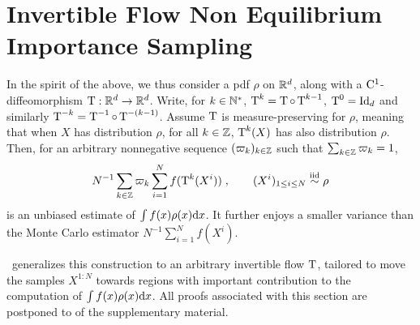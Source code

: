 \documentclass{article}
\begin{document}
\section{Invertible Flow Non Equilibrium Importance Sampling}\label{sec:IFIS}
In the spirit of the above, we thus consider a pdf $\rho$ on $\mathbb{R}^{d}$, along with a $\mathrm{C}^1$-diffeomorphism
$\operatorname{T}:\mathbb{R}^{d}\to \mathbb{R}^{d}$.
Write, for $k \in \mathbb{N}^*$, $\operatorname{T}^{k}=\operatorname{T}\circ\operatorname{T}^{k-1}$, $\operatorname{T}^{0}=\mathrm{Id}_{d}$ and similarly $\operatorname{T}^{-k}=\operatorname{T}^{-1}\circ\operatorname{T}^{-(k-1)}$.
Assume $\operatorname{T}$ is measure-preserving for $\rho$,
meaning that when $X$ has distribution $\rho$, for all $k\in \mathbb{Z}$, $\operatorname{T}^k(X)$ has also distribution $\rho$. Then,
for an arbitrary nonnegative sequence $(\varpi_k)_{k \in\mathbb{Z}}$ such that
$\sum_{k\in \mathbb{Z}} \varpi_k=1$, %
$$N^{-1} \sum_{k\in \mathbb{Z}} \varpi_k\sum_{i=1}^N  f(\operatorname{T}^k(X^i))\;,\qquad(X^i)_{1\le i\le N}\overset{\operatorname{iid}}{\sim}\rho$$ is an unbiased estimate of $\int f(x) \rho(x) \mathrm{d} x$. It further enjoys a smaller variance
than the Monte Carlo estimator $N^{-1} \sum_{i=1}^Nf(X^i)$.

\IFIS\ generalizes
this construction to an arbitrary invertible flow
$\operatorname{T}$, tailored to move the samples $X^{1:N}$ towards regions with important contribution to the computation of
$\int f(x) \rho(x) \mathrm{d} x$. All proofs associated with this section are postponed to  of the supplementary material.

\end{document}
